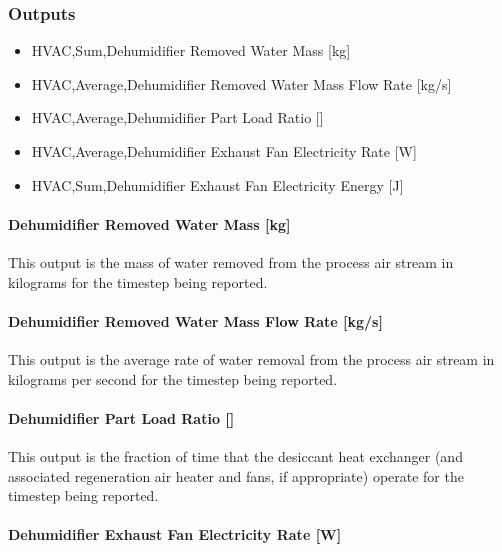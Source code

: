 \subsubsection{Outputs}\label{outputs-1-006}

\begin{itemize}
\item
  HVAC,Sum,Dehumidifier Removed Water Mass {[}kg{]}
\item
  HVAC,Average,Dehumidifier Removed Water Mass Flow Rate {[}kg/s{]}
\item
  HVAC,Average,Dehumidifier Part Load Ratio {[]}
\item
  HVAC,Average,Dehumidifier Exhaust Fan Electricity Rate {[}W{]}
\item
  HVAC,Sum,Dehumidifier Exhaust Fan Electricity Energy {[}J{]}
\end{itemize}

\paragraph{Dehumidifier Removed Water Mass {[}kg{]}}\label{dehumidifier-removed-water-mass-kg-1}

This output is the mass of water removed from the process air stream in kilograms for the timestep being reported.

\paragraph{Dehumidifier Removed Water Mass Flow Rate {[}kg/s{]}}\label{dehumidifier-removed-water-mass-flow-rate-kgs-1}

This output is the average rate of water removal from the process air stream in kilograms per second for the timestep being reported.

\paragraph{Dehumidifier Part Load Ratio {[]}}\label{dehumidifier-part-load-ratio-1}

This output is the fraction of time that the desiccant heat exchanger (and associated regeneration air heater and fans, if appropriate) operate for the timestep being reported.

\paragraph{Dehumidifier Exhaust Fan Electricity Rate {[}W{]}}\label{dehumidifier-exhaust-fan-electric-power-w}

